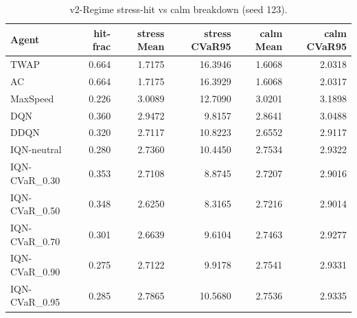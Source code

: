 \begin{table}[H]
    \centering
    \caption{v2-Regime stress-hit vs calm breakdown (seed 123).}
    \label{tab:v2_regime_breakdown}
    \begin{tabular}{@{}lrrrrr@{}}
        \toprule
        Agent & hit-frac & stress Mean & stress CVaR95 & calm Mean & calm CVaR95 \\
        \midrule
        TWAP & 0.664 & 1.7175 & 16.3946 & 1.6068 & 2.0318 \\
        AC & 0.664 & 1.7175 & 16.3929 & 1.6068 & 2.0317 \\
        MaxSpeed & 0.226 & 3.0089 & 12.7090 & 3.0201 & 3.1898 \\
        DQN & 0.360 & 2.9472 & 9.8157 & 2.8641 & 3.0488 \\
        DDQN & 0.320 & 2.7117 & 10.8223 & 2.6552 & 2.9117 \\
        IQN-neutral & 0.280 & 2.7360 & 10.4450 & 2.7534 & 2.9322 \\
        IQN-CVaR\_0.30 & 0.353 & 2.7108 & 8.8745 & 2.7207 & 2.9016 \\
        IQN-CVaR\_0.50 & 0.348 & 2.6250 & 8.3165 & 2.7216 & 2.9014 \\
        IQN-CVaR\_0.70 & 0.301 & 2.6639 & 9.6104 & 2.7463 & 2.9277 \\
        IQN-CVaR\_0.90 & 0.275 & 2.7122 & 9.9178 & 2.7541 & 2.9331 \\
        IQN-CVaR\_0.95 & 0.285 & 2.7865 & 10.5680 & 2.7536 & 2.9335 \\
        \bottomrule
    \end{tabular}
\end{table}
